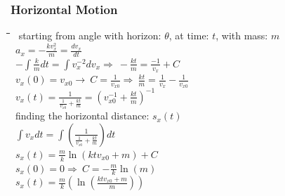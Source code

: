 \documentclass[10pt,letterpaper]{scrartcl}
\newcommand{\tbul}{\textbullet}
\newcommand{\tabDef}{\hspace{2em}\=\hspace{2em}\=\hspace{2em}\=\hspace{2em}\=\kill}
\begin{document}
\subsubsection*{Horizontal Motion}\begin{tabbing}\tabDef
\tbul\ starting from angle with horizon: $\theta$, at time: $t$, with mass: $m$\\
\>\>\ $\displaystyle a_x = -\frac{kv^2_x}{m} = \frac{dv_x}{dt}$ \\
\>\>\ $\displaystyle -\int\frac{k}{m}dt = \int v^{-2}_xdv_x\Rightarrow\ -\frac{kt}{m}=\frac{-1}{v_x}+C$\\ 
\>\>\ $\displaystyle v_x(0) = v_{x0}\rightarrow\ C = \frac{1}{v_{x0}}\Rightarrow\ \frac{kt}{m} = \frac{1}{v_x} - \frac{1}{v_{x0}}$\\
\>\>\ $\displaystyle v_x(t) = \frac{1}{\frac{1}{v_{x0}} + \frac{kt}{m}} = (v^{-1}_{x0} + \frac{kt}{m})^{-1}$ \\
\tbul\ finding the horizontal distance: $s_x(t)$\\
\>\>\ $\displaystyle \int v_xdt = \int (\frac{1}{\frac{1}{v_{x0}} + \frac{kt}{m}})dt$ \\
\>\>\ $\displaystyle s_x(t) = \frac{m}{k}\ln(ktv_{x0}+m)+C$ \\
\>\>\ $\displaystyle s_x(0) = 0\Rightarrow\ C = -\frac{m}{k}\ln(m)$ \\
\>\>\ $\displaystyle s_x(t) = \frac{m}{k}(\ln(\frac{ktv_{x0} + m}{m}))$\end{tabbing}
\end{document}
